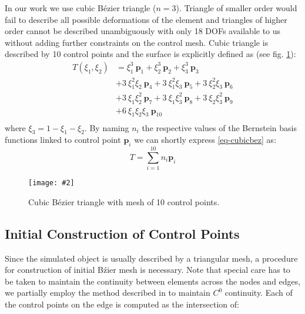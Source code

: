 \documentclass{egpubl}
\newcommand{\Figure}[3]{%
\begin{figure}[htb]
  \centering
  \texttt{[image: \#2]}
  \caption{\label{fig-#2}#3}
\end{figure}}
\begin{document}
In our work we use cubic B\'ezier triangle ($n=3$). Triangle of smaller order
would fail to describe all possible deformations of the element and
triangles of higher order cannot be described unambiguously with only 18
DOFs available to us without adding further constraints on the control
mesh. Cubic triangle is described by 10 control points and the surface is
explicitly defined as (see fig. \ref{fig-bezier2}):
%
\begin{equation}\label{eq-cubicbez}
  \begin{split}
  T(\xi_1,\xi_2) & =
      \xi_1^3\ \mathbf{p}_1
      + \xi_2^3\ \mathbf{p}_2
      + \xi_3^3\ \mathbf{p}_3 \\
      & + 3\ \xi_1^2 \xi_2\ \mathbf{p}_4
      + 3\ \xi_1^2 \xi_3\ \mathbf{p}_5
      + 3\ \xi_2^2 \xi_3\ \mathbf{p}_6 \\
      & + 3\ \xi_1 \xi_2^2\ \mathbf{p}_7
      + 3\ \xi_1 \xi_3^2\ \mathbf{p}_8
      + 3\ \xi_2 \xi_3^2\ \mathbf{p}_9 \\
      & + 6\ \xi_1 \xi_2 \xi_3\ \mathbf{p}_{10} \\
  \end{split}
\end{equation}
%
where $ \xi_3 = 1 - \xi_1 - \xi_2 $. By naming $n_i$ the respective values
of the Bernstein basis functions linked to control point $\mathbf{p}_i$ we can
shortly express \eqref{eq-cubicbez} as:
%
\begin{equation}\label{eq-cubicbez2}
    T = \sum_{i=1}^{10} n_i \mathbf{p}_i
\end{equation}

\Figure{0.6\linewidth}{bezier2}
{Cubic B\'ezier triangle with mesh of 10 control points.}


\subsection{Initial Construction of Control Points} %

Since the
simulated object is usually described by a triangular mesh,
a procedure for construction of initial B\'zier mesh is necessary.
Note that special care has to be taken to maintain
the continuity between elements across the nodes and edges, 
we partially employ the method described in \cite{Ubach2010} to maintain
$C^0$ continuity. Each of the control points on the edge is
computed as the intersection of:
\end{document}
